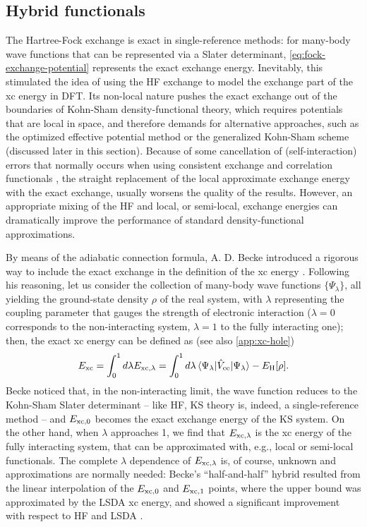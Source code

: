 \subsection{Hybrid functionals\label{sec:hybrids}}
The Hartree-Fock exchange is exact in single-reference methods: for many-body wave functions that can be represented via a Slater determinant, \cref{eq:fock-exchange-potential} represents the exact exchange energy. Inevitably, this stimulated the idea of using the HF exchange to model the exchange part of the xc energy in DFT. Its non-local nature pushes the exact exchange out of the boundaries of Kohn-Sham density-functional theory, which requires potentials that are local in space, and therefore demands for alternative approaches, such as the optimized effective potential method or the generalized Kohn-Sham scheme (discussed later in this section). Because of some cancellation of (self-interaction) errors that normally occurs when using consistent exchange and correlation functionals \cite{vydrov_effect_2004}, the straight replacement of the local approximate exchange energy with the exact exchange, usually worsens the quality of the results. However, an appropriate mixing of the HF and local, or semi-local, exchange energies can dramatically improve the performance of standard density-functional approximations.

By means of the adiabatic connection formula, A. D. Becke introduced a rigorous way to include the exact exchange in the definition of the xc energy \cite{becke_new_1993}. Following his reasoning, let us consider the collection of many-body wave functions $\{ \Psi_{\lambda} \}$, all yielding the ground-state density $\rho$ of the real system, with $\lambda$ representing the coupling parameter that gauges the strength of electronic interaction ($\lambda=0$ corresponds to the non-interacting system, $\lambda=1$ to the fully interacting one); then, the exact xc energy can be defined as (see also \cref{app:xc-hole})
%
\begin{equation}
    E_{\rm xc} = \int_0^1 d\lambda E_{{\rm xc},\lambda} = \int_0^1 d\lambda \braket{\Psi_{\lambda}|\hat{V}_{\rm ee}|\Psi_{\lambda}} - E_{\rm H}[\rho] .
    \label{eq:adiabatic-connection}
\end{equation}
%
Becke noticed that, in the non-interacting limit, the wave function reduces to the Kohn-Sham Slater determinant -- like HF, KS theory is, indeed, a single-reference method -- and $E_{{\rm xc},0}$ becomes the exact exchange energy of the KS system. On the other hand, when $\lambda$ approaches 1, we find that $E_{{\rm xc},\lambda}$ is the xc energy of the fully interacting system, that can be approximated with, e.g., local or semi-local functionals. The complete $\lambda$ dependence of $E_{{\rm xc},\lambda}$ is, of course, unknown and approximations are normally needed: Becke's ``half-and-half'' hybrid resulted from the linear interpolation of the $E_{{\rm xc},0}$ and $E_{{\rm xc},1}$ points, where the upper bound was approximated by the LSDA xc energy, and showed a significant improvement with respect to HF and LSDA \cite{becke_new_1993}.


